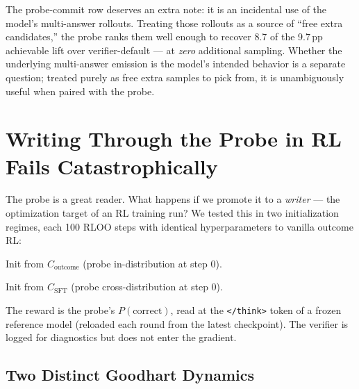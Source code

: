 \documentclass[11pt]{article}
\begin{document}
The probe-commit row deserves an extra note: it is an incidental use of the model's multi-answer rollouts. Treating those rollouts as a source of ``free extra candidates,'' the probe ranks them well enough to recover 8.7 of the 9.7\,pp achievable lift over verifier-default --- at \emph{zero} additional sampling. Whether the underlying multi-answer emission is the model's intended behavior is a separate question; treated purely as free extra samples to pick from, it is unambiguously useful when paired with the probe.

\section{Writing Through the Probe in RL Fails Catastrophically}\label{sec:probe-rl}

The probe is a great reader. What happens if we promote it to a \emph{writer} --- the optimization target of an RL training run? We tested this in two initialization regimes, each 100 RLOO steps with identical hyperparameters to vanilla outcome RL:
\begin{description}[leftmargin=2em,itemsep=2pt,topsep=2pt]
  \item[\texttt{runA}] Init from $C_{\text{outcome}}$ (probe in-distribution at step 0).
  \item[\texttt{runB}] Init from $C_{\text{SFT}}$ (probe cross-distribution at step 0).
\end{description}
The reward is the probe's $P(\text{correct})$, read at the \texttt{</think>} token of a frozen reference model (reloaded each round from the latest checkpoint). The verifier is logged for diagnostics but does not enter the gradient.

\subsection{Two Distinct Goodhart Dynamics}
\end{document}

